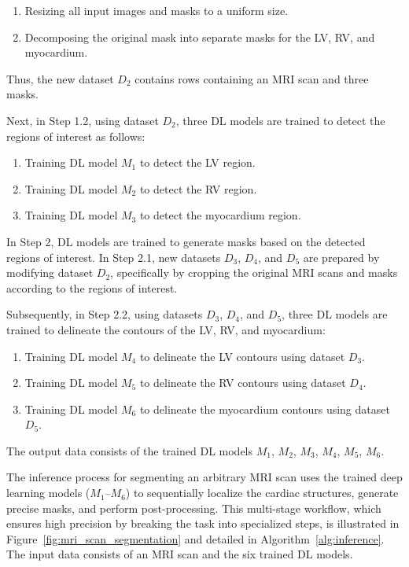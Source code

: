 \documentclass[fleqn,10pt]{wlscirep}
\begin{document}
\begin{enumerate}[label=Step 1.1.\arabic*:, leftmargin=6.5em]
    \item Resizing all input images and masks to a uniform size.
    \item Decomposing the original mask into separate masks for the LV, RV, and myocardium.
\end{enumerate}

Thus, the new dataset \({D_2}\) contains rows containing an MRI scan and three masks.

Next, in Step 1.2, using dataset \({D_2}\), three DL models are trained to detect the regions of interest as follows:

\begin{enumerate}[label=Step 1.2.\arabic*:, leftmargin=6.5em]
    \item Training DL model \({M_1}\) to detect the LV region.
    \item Training DL model \({M_2}\) to detect the RV region.
    \item Training DL model \({M_3}\) to detect the myocardium region.
\end{enumerate}

In Step 2, DL models are trained to generate masks based on the detected regions of interest. In Step 2.1, new datasets \({D_3}\), \({D_4}\), and \({D_5}\) are prepared by modifying dataset \({D_2}\), specifically by cropping the original MRI scans and masks according to the regions of interest.

Subsequently, in Step 2.2, using datasets \({D_3}\), \({D_4}\), and \({D_5}\), three DL models are trained to delineate the contours of the LV, RV, and myocardium:

\begin{enumerate}[label=Step 2.2.\arabic*:, leftmargin=6.5em]
    \item Training DL model \({M_4}\) to delineate the LV contours using dataset \({D_3}\).
    \item Training DL model \({M_5}\) to delineate the RV contours using dataset \({D_4}\).
    \item Training DL model \({M_6}\) to delineate the myocardium contours using dataset \({D_5}\).
\end{enumerate}

The output data consists of the trained DL models \({M_1}\), \({M_2}\), \({M_3}\), \({M_4}\), \({M_5}\), \({M_6}\).

The inference process for segmenting an arbitrary MRI scan uses the trained deep learning models (\(M_1\)–\(M_6\)) to sequentially localize the cardiac structures, generate precise masks, and perform post-processing. This multi-stage workflow, which ensures high precision by breaking the task into specialized steps, is illustrated in Figure~\ref{fig:mri_scan_segmentation} and detailed in Algorithm~\ref{alg:inference}. The input data consists of an MRI scan and the six trained DL models.
\end{document}
